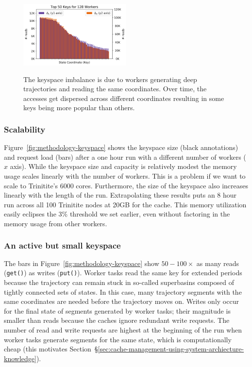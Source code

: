 \begin{figure}[t]
  \noindent\includegraphics[width=0.5\textwidth]{figures/methodology-keys.png}\\
  \caption{The keyspace imbalance is due to workers generating deep
  trajectories and reading the same coordinates. Over time, the accesses get
  dispersed across different coordinates resulting in some keys being more
  popular than others.\label{fig:methodology-keys}}
\end{figure}

\subsubsection*{Scalability} Figure~\ref{fig:methodology-keyspace} shows the
keyspace size (black annotations) and request load (bars) after a one hour run
with a different number of workers (\(x\) axis). While the keyspace size and
capacity is relatively modest the memory usage scales linearly with the number
of workers. This is a problem if we want to scale to Trinitite's 6000 cores.
Furthermore, the size of the keyspace also increases linearly with the length
of the run.  Extrapolating these results puts an 8 hour run across all 100
Trinitite nodes at 20GB for the cache.  This memory utilization easily eclipses
the 3\% threshold we set earlier, even without factoring in the memory usage
from other workers.

\subsubsection*{An active but small keyspace} The bars in
Figure~\ref{fig:methodology-keyspace} show \(50-100\times\) as many reads
(\texttt{get()}) as writes (\texttt{put()}).  Worker tasks read the same key
for extended periods because the trajectory can remain stuck in so-called
superbasins composed of tightly connected sets of states. In this case, many
trajectory segments with the same coordinates are needed before the trajectory
moves on.  Writes only occur for the final state of segments generated by
worker tasks; their magnitude is smaller than reads because the caches ignore
redundant write requests. The number of read and write requests are highest at
the beginning of the run when worker tasks generate segments for the same
state, which is computationally cheap (this motivates
Section~\S\ref{sec:cache-management-using-system-archiecture-knowledge}).

